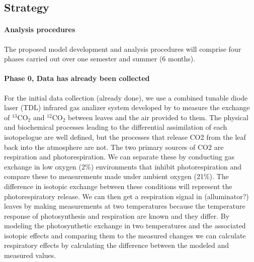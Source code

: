 \documentclass[12pt]{article}
\begin{document}
\subsection{Strategy}

\paragraph{Analysis procedures}

The proposed model development and analysis procedures will comprise
  four phases carried out over one semester and summer (6 months).

\paragraph{Phase 0, Data has already been collected}
For the initial data collection (already done),
  we use a combined tunable diode laser (TDL) infrared gas analizer system
  developed by \citet{barbour2007new}
  to measure
  the exchange of $^{13}$CO$_2$ and $^{12}$CO$_2$ between leaves and the air provided to them.
The physical and biochemical processes leading to the differential assimilation of each isotopelogue
are well defined, but
the processes that release CO2 from the leaf back into the atmosphere are not.
The two primary sources of CO2 are respiration and photorespiration.
We can separate these by conducting gas exchange in low oxygen (2\%)
  environments that inhibit photorespiration and compare these to
  measurements made under ambient oxygen (21\%).
The difference in isotopic exchange between these conditions will represent
  the photorespiratory release.
We can then get a respiration signal in (alluminator?) leaves by making measurements
  at two temperatures because the temperature response of photosynthesis and respiration
  are known and they differ.
By modeling the photosynthetic exchange in two temperatures
  and the associated isotopic effects
  and comparing them to the measured changes we can calculate
  respiratory effects by calculating the difference between the modeled and measured values.
\end{document}
